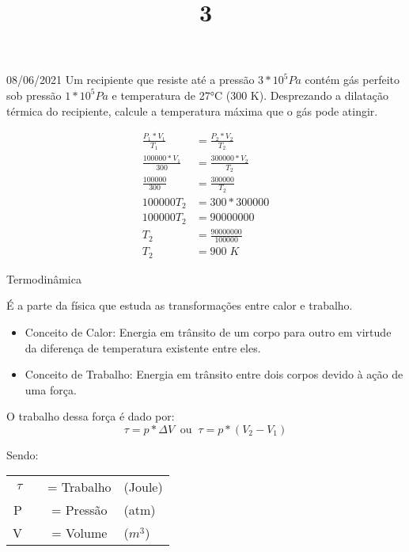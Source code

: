 \documentclass{SchoolBook}
\begin{document}
\begin{day}{08/06/2021}
        Um recipiente que resiste até a pressão $3 * 10^5 Pa$ contém gás perfeito sob pressão $1*10^5 Pa$ e temperatura de 27°C (300 K). Desprezando a dilatação térmica do recipiente, calcule a temperatura máxima que o gás pode atingir.
        
        \begin{align*}
            \frac{P_1 * V_1}{T_1} &= \frac{P_2 * V_2}{T_2} \\
            \frac{100000 * V_1}{300} &= \frac{300000 * V_2}{T_2} \\
            \frac{100000}{300} &= \frac{300000}{T_2} \\
            100000 T_2 &= 300 * 300000 \\
            100000 T_2 &= 90000000 \\
            T_2 &= \frac{90000000}{100000} \\
            T_2 &= 900\;K
        \end{align*}
        
        \title{3}{Termodinâmica}
        
        É a parte da física que estuda as transformações entre calor e trabalho.
        
        \begin{itemize}
            \item Conceito de Calor: Energia em trânsito de um corpo para outro em virtude da diferença de temperatura existente entre eles.
            \item Conceito de Trabalho: Energia em trânsito entre dois corpos devido à ação de uma força.
        \end{itemize}
        
        O trabalho dessa força é dado por:
        $$ \tau = p * \Delta V \;\;\text{ou}\;\; \tau = p * (V_2 - V_1) $$
        
        Sendo:
        
        \begin{tabular}{rccl}
            $\tau$ &&= Trabalho & (Joule) \\
            P      &&= Pressão  & (atm)   \\
            V      &&= Volume   & ($m^3$)
        \end{tabular}
    \end{day}
    
\end{document}
